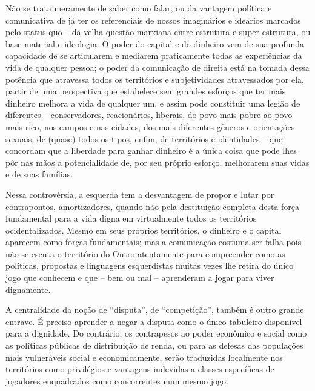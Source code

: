 Não se trata meramente de saber como falar, ou da vantagem política e comunicativa de já ter os referenciais de nossos imaginários e ideários marcados pelo status quo -- da velha questão marxiana entre estrutura e super-estrutura, ou base material e ideologia. O poder do capital e do dinheiro vem de sua profunda capacidade de se articularem e mediarem praticamente todas as experiências da vida de qualquer pessoa; o poder da comunicação de direita está na tomada dessa potência que atravessa todos os territórios e subjetividades atravessados por ela, partir de uma perspectiva que estabelece sem grandes esforços que ter mais dinheiro melhora a vida de qualquer um, e assim pode constituir uma legião de diferentes -- conservadores, reacionários, liberais, do povo mais pobre ao povo mais rico, nos campos e nas cidades, dos mais diferentes gêneros e orientações sexuais, de (quase) todos os tipos, enfim, de territórios e identidades -- que concordam que a liberdade para ganhar dinheiro é a única coisa que pode lhes pôr nas mãos a potencialidade de, por seu próprio esforço, melhorarem suas vidas e de suas famílias.

Nessa controvérsia, a esquerda tem a desvantagem de propor e lutar por contrapontos, amortizadores, quando não pela destituição completa desta força fundamental para a vida digna em virtualmente todos os territórios ocidentalizados. Mesmo em seus próprios territórios, o dinheiro e o capital aparecem como forças fundamentais; mas a comunicação costuma ser falha pois não se escuta o território do Outro atentamente para compreender como as políticas, propostas e linguagens esquerdistas muitas vezes lhe retira do único jogo que conhecem e que -- bem ou mal -- aprenderam a jogar para viver dignamente.

A centralidade da noção de \enquote{disputa}, de \enquote{competição}, também é outro grande entrave. É preciso aprender a negar a disputa como o único tabuleiro disponível para a dignidade. Do contrário, os contrapesos ao poder econômico e social como as políticas públicas de distribuição de renda, ou para as defesas das populações mais vulneráveis social e economicamente, serão traduzidas localmente nos territórios como privilégios e vantagens indevidas a classes específicas de jogadores enquadrados como concorrentes num mesmo jogo.

